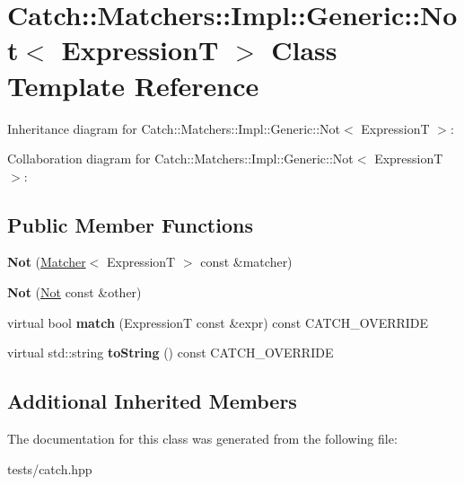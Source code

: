 \hypertarget{class_catch_1_1_matchers_1_1_impl_1_1_generic_1_1_not}{}\section{Catch\+:\+:Matchers\+:\+:Impl\+:\+:Generic\+:\+:Not$<$ ExpressionT $>$ Class Template Reference}
\label{class_catch_1_1_matchers_1_1_impl_1_1_generic_1_1_not}


Inheritance diagram for Catch\+:\+:Matchers\+:\+:Impl\+:\+:Generic\+:\+:Not$<$ ExpressionT $>$\+:


Collaboration diagram for Catch\+:\+:Matchers\+:\+:Impl\+:\+:Generic\+:\+:Not$<$ ExpressionT $>$\+:
\subsection*{Public Member Functions}
\begin{DoxyCompactItemize}
\item 
\mbox{\label{class_catch_1_1_matchers_1_1_impl_1_1_generic_1_1_not_a9b99e3ce49c1a16931708b67c312f204}} 
{\bfseries Not} (\hyperlink{struct_catch_1_1_matchers_1_1_impl_1_1_matcher}{Matcher}$<$ ExpressionT $>$ const \&matcher)
\item 
\mbox{\label{class_catch_1_1_matchers_1_1_impl_1_1_generic_1_1_not_a46eccbbaeec259d3536aa2a29f95208f}} 
{\bfseries Not} (\hyperlink{class_catch_1_1_matchers_1_1_impl_1_1_generic_1_1_not}{Not} const \&other)
\item 
\mbox{\label{class_catch_1_1_matchers_1_1_impl_1_1_generic_1_1_not_a18c49fc6fb73a42d54650dafc18c7db1}} 
virtual bool {\bfseries match} (ExpressionT const \&expr) const C\+A\+T\+C\+H\+\_\+\+O\+V\+E\+R\+R\+I\+DE
\item 
\mbox{\label{class_catch_1_1_matchers_1_1_impl_1_1_generic_1_1_not_ab970a4a6e58a987451e0b0e0e60a0bff}} 
virtual std\+::string {\bfseries to\+String} () const C\+A\+T\+C\+H\+\_\+\+O\+V\+E\+R\+R\+I\+DE
\end{DoxyCompactItemize}
\subsection*{Additional Inherited Members}


The documentation for this class was generated from the following file\+:\begin{DoxyCompactItemize}
\item 
tests/catch.\+hpp\end{DoxyCompactItemize}
